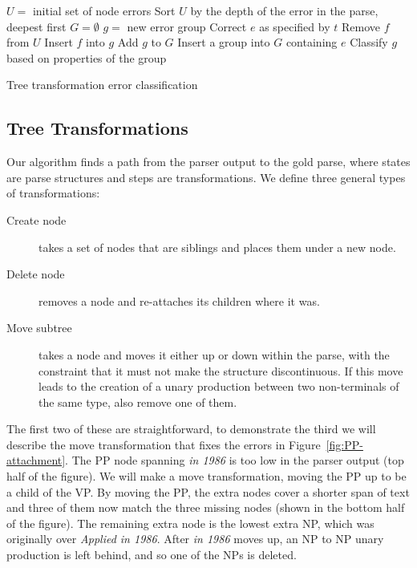 \begin{algorithm}[t]
\begin{algorithmic}
\State $U =$ initial set of node errors
\State Sort $U$ by the depth of the error in the parse, deepest first
\State
\State $G = \emptyset$ 
\Repeat
			\State $g =$ new error group
			\State Correct $e$ as specified by $t$
				\State Remove $f$ from $U$
				\State Insert $f$ into $g$
			\EndFor
			\State Add $g$ to $G$
		\EndIf
	\EndFor
{}
	\State Insert a group into $G$ containing $e$
\EndFor
\State
{} 
	\State Classify $g$ based on properties of the group
\EndFor
\end{algorithmic}
\caption{ \label{alg:code}
	Tree transformation error classification
}
\end{algorithm}

\subsection{Tree Transformations} \label{sec:tree-transform}

Our algorithm finds a path from the parser output to the gold parse, where states are parse structures and steps are transformations.
We define three general types of transformations:

\begin{description}
  \item[Create node] takes a set of nodes that are siblings and places them under a new node.
  \item[Delete node] removes a node and re-attaches its children where it was.
  \item[Move subtree] takes a node and moves it either up or down within the parse, with the constraint that it must not make the structure discontinuous. If this move leads to the creation of a unary production between two non-terminals of the same type, also remove one of them.
\end{description}

The first two of these are straightforward, to demonstrate the third we will describe the move transformation that fixes the errors in Figure~\ref{fig:PP-attachment}.
The PP node spanning \emph{in 1986} is too low in the parser output (top half of the figure).
We will make a move transformation, moving the PP up to be a child of the VP.
By moving the PP, the extra nodes cover a shorter span of text and three of them now match the three missing nodes (shown in the bottom half of the figure).
The remaining extra node is the lowest extra NP, which was originally over \emph{Applied in 1986}.
After \emph{in 1986} moves up, an NP to NP unary production is left behind, and so one of the NPs is deleted.

